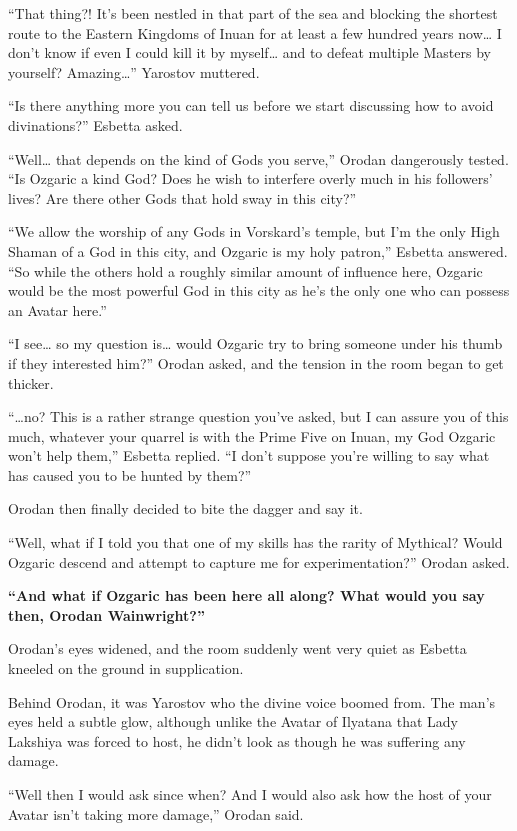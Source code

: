 \documentclass[a4paper,10pt]{book}
\begin{document}
“That thing?! It’s been nestled in that part of the sea and blocking the shortest route to the Eastern Kingdoms of Inuan for at least a few hundred years now… I don’t know if even I could kill it by myself… and to defeat multiple Masters by yourself? Amazing…” Yarostov muttered.\par
“Is there anything more you can tell us before we start discussing how to avoid divinations?” Esbetta asked.\par
“Well… that depends on the kind of Gods you serve,” Orodan dangerously tested. “Is Ozgaric a kind God? Does he wish to interfere overly much in his followers’ lives? Are there other Gods that hold sway in this city?”\par
“We allow the worship of any Gods in Vorskard’s temple, but I’m the only High Shaman of a God in this city, and Ozgaric is my holy patron,” Esbetta answered. “So while the others hold a roughly similar amount of influence here, Ozgaric would be the most powerful God in this city as he’s the only one who can possess an Avatar here.”\par
“I see… so my question is… would Ozgaric try to bring someone under his thumb if they interested him?” Orodan asked, and the tension in the room began to get thicker.\par
“…no? This is a rather strange question you’ve asked, but I can assure you of this much, whatever your quarrel is with the Prime Five on Inuan, my God Ozgaric won’t help them,” Esbetta replied. “I don’t suppose you’re willing to say what has caused you to be hunted by them?”\par
Orodan then finally decided to bite the dagger and say it.\par
“Well, what if I told you that one of my skills has the rarity of Mythical? Would Ozgaric descend and attempt to capture me for experimentation?” Orodan asked.\par
\textbf{“And what if Ozgaric has been here all along? What would you say then, Orodan Wainwright?”}\par
Orodan’s eyes widened, and the room suddenly went very quiet as Esbetta kneeled on the ground in supplication.\par
Behind Orodan, it was Yarostov who the divine voice boomed from. The man’s eyes held a subtle glow, although unlike the Avatar of Ilyatana that Lady Lakshiya was forced to host, he didn’t look as though he was suffering any damage.\par
“Well then I would ask since when? And I would also ask how the host of your Avatar isn’t taking more damage,” Orodan said.\par
\end{document}
